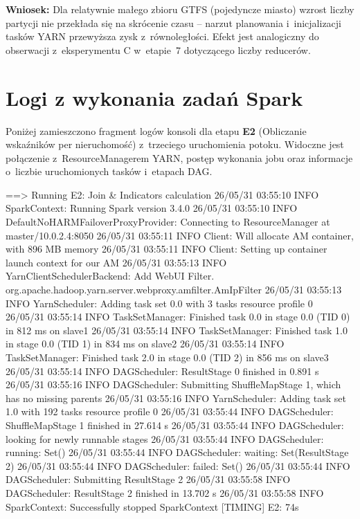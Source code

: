 \documentclass{labreport}
\begin{document}
\textbf{Wniosek:} Dla relatywnie małego zbioru GTFS (pojedyncze miasto) wzrost liczby partycji nie przekłada się na skrócenie czasu -- narzut planowania i~inicjalizacji tasków YARN przewyższa zysk z~równoległości. Efekt jest analogiczny do obserwacji z~eksperymentu C w~etapie~7 dotyczącego liczby reducerów.

\section{Logi z wykonania zadań Spark}

Poniżej zamieszczono fragment logów konsoli dla etapu \textbf{E2} (Obliczanie wskaźników per nieruchomość) z~trzeciego uruchomienia potoku. Widoczne jest połączenie z~ResourceManagerem YARN, postęp wykonania jobu oraz informacje o~liczbie uruchomionych tasków i~etapach DAG.

\begin{console}
==> Running E2: Join & Indicators calculation
26/05/31 03:55:10 INFO SparkContext: Running Spark version 3.4.0
26/05/31 03:55:10 INFO DefaultNoHARMFailoverProxyProvider: Connecting to ResourceManager at master/10.0.2.4:8050
26/05/31 03:55:11 INFO Client: Will allocate AM container, with 896 MB memory
26/05/31 03:55:11 INFO Client: Setting up container launch context for our AM
26/05/31 03:55:13 INFO YarnClientSchedulerBackend: Add WebUI Filter. org.apache.hadoop.yarn.server.webproxy.amfilter.AmIpFilter
26/05/31 03:55:13 INFO YarnScheduler: Adding task set 0.0 with 3 tasks resource profile 0
26/05/31 03:55:14 INFO TaskSetManager: Finished task 0.0 in stage 0.0 (TID 0) in 812 ms on slave1
26/05/31 03:55:14 INFO TaskSetManager: Finished task 1.0 in stage 0.0 (TID 1) in 834 ms on slave2
26/05/31 03:55:14 INFO TaskSetManager: Finished task 2.0 in stage 0.0 (TID 2) in 856 ms on slave3
26/05/31 03:55:14 INFO DAGScheduler: ResultStage 0 finished in 0.891 s
26/05/31 03:55:16 INFO DAGScheduler: Submitting ShuffleMapStage 1, which has no missing parents
26/05/31 03:55:16 INFO YarnScheduler: Adding task set 1.0 with 192 tasks resource profile 0
26/05/31 03:55:44 INFO DAGScheduler: ShuffleMapStage 1 finished in 27.614 s
26/05/31 03:55:44 INFO DAGScheduler: looking for newly runnable stages
26/05/31 03:55:44 INFO DAGScheduler: running: Set()
26/05/31 03:55:44 INFO DAGScheduler: waiting: Set(ResultStage 2)
26/05/31 03:55:44 INFO DAGScheduler: failed: Set()
26/05/31 03:55:44 INFO DAGScheduler: Submitting ResultStage 2
26/05/31 03:55:58 INFO DAGScheduler: ResultStage 2 finished in 13.702 s
26/05/31 03:55:58 INFO SparkContext: Successfully stopped SparkContext
[TIMING] E2: 74s
\end{console}
\end{document}
